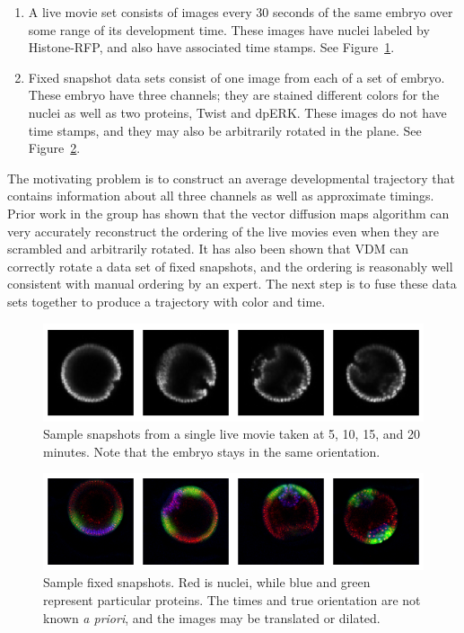 \documentclass[12pt]{article}
\begin{document}
\begin{enumerate}
\item A live movie set consists of images every 30 seconds of the same embryo over some range of its development time. These images have nuclei labeled by Histone-RFP, and also have associated time stamps. See Figure~\ref{fig:live}.
\item Fixed snapshot data sets consist of one image from each of a set of embryo. These embryo have three channels; they are stained different colors for the nuclei as well as two proteins, Twist and dpERK. These images do not have time stamps, and they may also be arbitrarily rotated in the plane. See Figure~\ref{fig:fixed}.
\end{enumerate}

The motivating problem is to construct an average developmental trajectory that contains information about all three channels as well as approximate timings. Prior work in the group has shown that the vector diffusion maps algorithm can very accurately reconstruct the ordering of the live movies even when they are scrambled and arbitrarily rotated. It has also been shown that VDM can correctly rotate a data set of fixed snapshots, and the ordering is reasonably well consistent with manual ordering by an expert. The next step is to fuse these data sets together to produce a trajectory with color and time.

\def\livegraphic{\includegraphics[width=\linewidth]{figures/live}}
\begin{figure}[here]
\livegraphic
\caption{Sample snapshots from a single live movie taken at 5, 10, 15, and 20 minutes. Note that the embryo stays in the same orientation.}
\label{fig:live}
\end{figure}
\newlength{\liveheight}
\settoheight{\liveheight}{\livegraphic}

\begin{figure}[here]
\includegraphics[width=\linewidth]{figures/fixed}
\caption{Sample fixed snapshots. Red is nuclei, while blue and green represent particular proteins. The times and true orientation are not known \textit{a priori}, and the images may be translated or dilated.}
\label{fig:fixed}
\end{figure}
\end{document}
